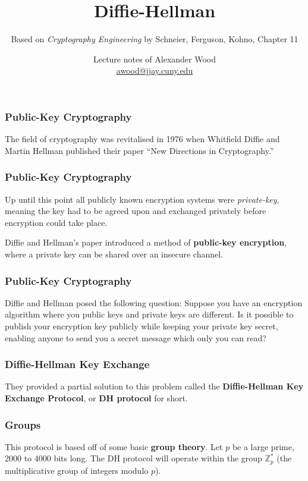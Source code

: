 \documentclass{beamer}
\title[Primes]{Diffie-Hellman}
\subtitle{Based on  \emph{Cryptography Engineering} by Schneier, Ferguson, Kohno, Chapter 11}
\author{Lecture notes of Alexander Wood \\ \scriptsize \href{mailto:awood@jjay.cuny.edu}{awood@jjay.cuny.edu}}
\institute[JJay]{John Jay College of Criminal Justice}
\date{}
\newcommand{\<}{\langle}
\renewcommand{\>}{\rangle}
\newcommand{\Z}{\mathbb{Z}}
\begin{document}

\begin{frame}
  \titlepage
\end{frame}

\begin{frame}
\frametitle{Public-Key Cryptography}

The field of cryptography was revitalised in 1976 when Whitfield Diffie and Martin Hellman published their paper ``New Directions in Cryptography.''
\end{frame}

\begin{frame}
\frametitle{Public-Key Cryptography}

Up until this point all publicly known encryption systems were \emph{private-key}, meaning the key had to be agreed upon and exchanged privately before encryption could take place. \newline

Diffie and Hellman's paper introduced a method of \textbf{public-key encryption}, where a private key can be shared over an insecure channel. 
\end{frame}

\begin{frame}
\frametitle{Public-Key Cryptography}

Diffie and Hellman posed the following question: Suppose you have an encryption algorithm where you public keys and private keys are different. Is it possible to publish your encryption key publicly while keeping your private key secret, enabling anyone to send you a secret message which only you can read? 
\end{frame}

\begin{frame}
\frametitle{Diffie-Hellman Key Exchange}

They provided a partial solution to this problem called the \textbf{Diffie-Hellman Key Exchange Protocol}, or \textbf{DH protocol} for short. 
\end{frame}


\begin{frame}
\frametitle{Groups}

This protocol is based off of some basic \textbf{group theory}. Let $p$ be a large prime, 2000 to 4000 bits long. The DH protocol will operate within the group $\Z_p^*$ (the multiplicative group of integers modulo $p$). 
\end{frame}
\end{document}

